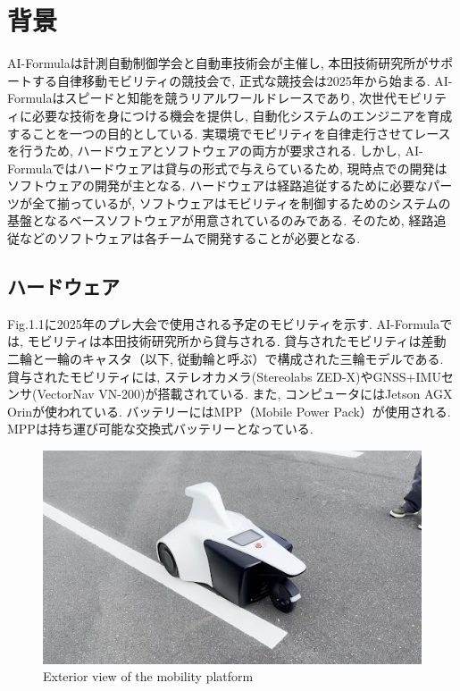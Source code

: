 
\section{背景}
AI-Formulaは計測自動制御学会と自動車技術会が主催し, 本田技術研究所がサポートする自律移動モビリティの競技会で, 正式な競技会は2025年から始まる. \cite{aiformula}
AI-Formulaはスピードと知能を競うリアルワールドレースであり, 次世代モビリティに必要な技術を身につける機会を提供し, 自動化システムのエンジニアを育成することを一つの目的としている.
%
実環境でモビリティを自律走行させてレースを行うため, ハードウェアとソフトウェアの両方が要求される.
しかし, AI-Formulaではハードウェアは貸与の形式で与えらているため, 現時点での開発はソフトウェアの開発が主となる.
ハードウェアは経路追従するために必要なパーツが全て揃っているが, ソフトウェアはモビリティを制御するためのシステムの基盤となるベースソフトウェアが用意されているのみである. \cite{aiformula-support}
そのため, 経路追従などのソフトウェアは各チームで開発することが必要となる.
\cite{aiformula-chibakou} \cite{aiformula-repo}


\subsection{ハードウェア}
Fig.1.1に2025年のプレ大会で使用される予定のモビリティを示す.
AI-Formulaでは, モビリティは本田技術研究所から貸与される.
貸与されたモビリティは差動二輪と一輪のキャスタ（以下, 従動輪と呼ぶ）で構成された三輪モデルである.
貸与されたモビリティには, ステレオカメラ(Stereolabs ZED-X)やGNSS+IMUセンサ(VectorNav VN-200)が搭載されている.
また, コンピュータにはJetson AGX Orinが使われている.
バッテリーにはMPP（Mobile Power Pack）が使用される. MPPは持ち運び可能な交換式バッテリーとなっている. 

\begin{figure}[H]
  \centering
 \includegraphics[keepaspectratio, scale=0.6]
      {images/ExteriorViewOfTheMobilityPlatform.png}
 \caption{Exterior view of the mobility platform}
 \label{fig:robot view}
\end{figure}

